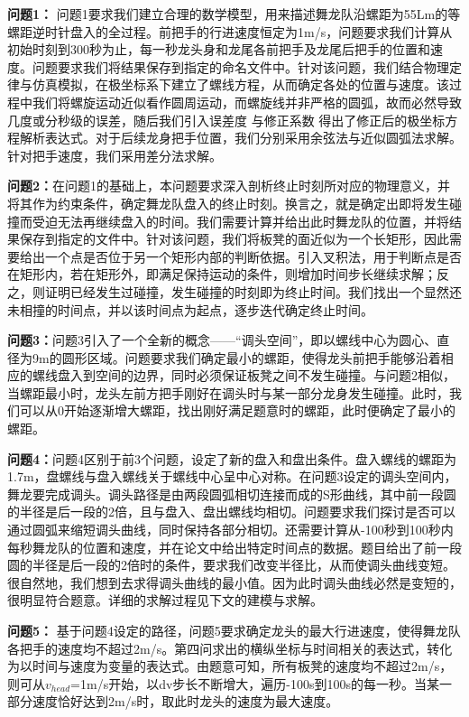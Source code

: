 \documentclass{cumcmthesis1}
\begin{document}
\par 
\textbf{问题1：} 问题1要求我们建立合理的数学模型，用来描述舞龙队沿螺距为55Lm的等螺距逆时针盘入的全过程。前把手的行进速度恒定为1m/s，问题要求我们计算从初始时刻到300秒为止，每一秒龙头身和龙尾各前把手及龙尾后把手的位置和速度。问题要求我们将结果保存到指定的命名文件中。针对该问题，我们结合物理定律与仿真模拟，在极坐标系下建立了螺线方程，从而确定各处的位置与速度。该过程中我们将螺旋运动近似看作圆周运动，而螺旋线并非严格的圆弧，故而必然导致几度或分秒级的误差，随后我们引入误差度 \text{$\eta$}与修正系数 \text{$\alpha$}得出了修正后的极坐标方程解析表达式。对于后续龙身把手位置，我们分别采用余弦法与近似圆弧法求解。针对把手速度，我们采用差分法求解。
\par
\textbf{问题2：}在问题1的基础上，本问题要求深入剖析终止时刻所对应的物理意义，并将其作为约束条件，确定舞龙队盘入的终止时刻。换言之，就是确定出即将发生碰撞而受迫无法再继续盘入的时间。我们需要计算并给出此时舞龙队的位置，并将结果保存到指定的文件中。针对该问题，我们将板凳的面近似为一个长矩形，因此需要给出一个点是否位于另一个矩形内部的判断依据。引入叉积法，用于判断点是否在矩形内，若在矩形外，即满足保持运动的条件，则增加时间步长继续求解；反之，则证明已经发生过碰撞，发生碰撞的时刻即为终止时间。我们找出一个显然还未相撞的时间点，并以该时间点为起点，逐步迭代确定终止时间。
\par
\textbf{问题3：}问题3引入了一个全新的概念——“调头空间”，即以螺线中心为圆心、直径为9m的圆形区域。问题要求我们确定最小的螺距，使得龙头前把手能够沿着相应的螺线盘入到空间的边界，同时必须保证板凳之间不发生碰撞。与问题2相似，当螺距最小时，龙头左前方把手刚好在调头时与某一部分龙身发生碰撞。此时，我们可以从0开始逐渐增大螺距，找出刚好满足题意时的螺距，此时便确定了最小的螺距。
\par
\textbf{问题4：}问题4区别于前3个问题，设定了新的盘入和盘出条件。盘入螺线的螺距为1.7m，盘螺线与盘入螺线关于螺线中心呈中心对称。在问题3设定的调头空间内，舞龙要完成调头。调头路径是由两段圆弧相切连接而成的S形曲线，其中前一段圆的半径是后一段的2倍，且与盘入、盘出螺线均相切。问题要求我们探讨是否可以通过圆弧来缩短调头曲线，同时保持各部分相切。还需要计算从-100秒到100秒内每秒舞龙队的位置和速度，并在论文中给出特定时间点的数据。题目给出了前一段圆的半径是后一段的2倍时的条件，要求我们改变半径比，从而使调头曲线变短。很自然地，我们想到去求得调头曲线的最小值。因为此时调头曲线必然是变短的，很明显符合题意。详细的求解过程见下文的建模与求解。
\par
\textbf{问题5：} 基于问题4设定的路径，问题5要求确定龙头的最大行进速度，使得舞龙队各把手的速度均不超过2m/s。第四问求出的横纵坐标与时间相关的表达式，转化为以时间与速度为变量的表达式。由题意可知，所有板凳的速度均不超过2m/s，则可从$v_{head}$=1m/s开始，以dv步长不断增大，遍历-100s到100s的每一秒。当某一部分速度恰好达到2m/s时，取此时龙头的速度为最大速度。
\end{document}
